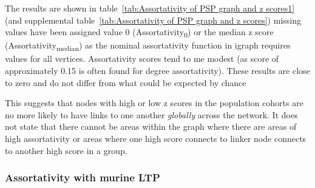  
 



The results are shown in table~\ref{tab:Assortativity of PSP graph and z scores1} (and supplemental table~\ref{tab:Assortativity of PSP graph and z scores}) missing values have been assigned value 0 (Assortativity\textsubscript{0}) or the median z score (Assortativity\textsubscript{median}) as the nominal assortativity function in igraph requires values for all vertices. Assortativity scores tend to me modest (as score of approximately 0.15 is often found for degree assortativity).  These results are close to zero and do not differ from what could be expected by chance 

This suggests that nodes with high or low z scores in the population cohorts are no more likely to have links to one another \textit{globally} across the network. It does not state that there cannot be areas within the graph where there are areas of high assortativity or areas where one high score connects to linker node connects to another high score in a group.

\subsubsection{Assortativity with murine LTP}



